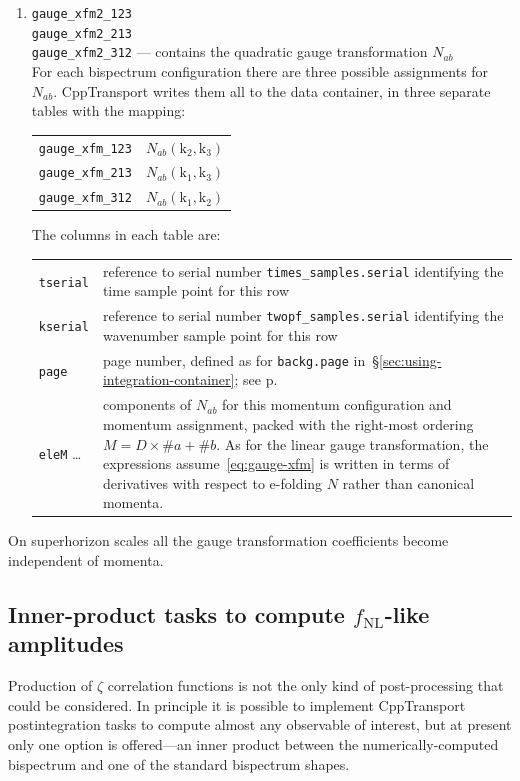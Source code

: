 \documentclass[11pt,a4paper]{article}
\newcommand{\fNL}{f_{\mathrm{NL}}}
\newcommand{\vect}[1]{\bm{\mathrm{{#1}}}}
\newcommand{\packagefont}{\sffamily}
\newcommand{\CppTransport}{{\packagefont CppTransport}}
\newenvironment{sqltablelist}{\renewcommand{\arraystretch}{1.3}\small}{}
\begin{document}
\begin{sqltablelist}
\begin{enumerate}
	\item \texttt{gauge_xfm2_123} \\
    \texttt{gauge_xfm2_213} \\
    \texttt{gauge_xfm2_312} --- contains the quadratic gauge transformation $N_{ab}$ \\
    For each bispectrum configuration there are three possible assignments
    for $N_{ab}$.
    {\CppTransport} writes them all to the data container, in three separate tables
    with the mapping: \\
    \begin{tabular}{p{2.5cm}p{11.5cm}}
    	\texttt{gauge_xfm_123} & $N_{ab}(\vect{k}_2, \vect{k}_3)$ \\
    	\texttt{gauge_xfm_213} & $N_{ab}(\vect{k}_1, \vect{k}_3)$ \\
    	\texttt{gauge_xfm_312} & $N_{ab}(\vect{k}_1, \vect{k}_2)$
    \end{tabular}
	The columns in each table are: \\
	\begin{tabular}{p{2.5cm}p{11.5cm}}
		\texttt{tserial} & reference to serial number \texttt{times_samples.serial}
        identifying the time sample point for this row \\
        \texttt{kserial} & reference to serial number \texttt{twopf_samples.serial}
        identifying the wavenumber sample point for this row \\
        \texttt{page} & page number, defined as for \texttt{backg.page}
        in~\S\ref{sec:using-integration-container}; see p.\pageref{sqltable:backg} \\
        \texttt{eleM} \ldots & components of $N_{ab}$ for this
        momentum configuration and momentum assignment, packed with the right-most
        ordering $M = D \times \#a + \#b$.
        As for the linear gauge transformation, the expressions assume~\eqref{eq:gauge-xfm}
        is written in terms of derivatives with respect to e-folding $N$
        rather than canonical momenta.
	\end{tabular}
\end{enumerate}	
\end{sqltablelist}
On superhorizon scales all the gauge transformation coefficients become independent of
momenta.

\subsection{Inner-product tasks to compute $\fNL$-like amplitudes}
\label{sec:inner-products}
Production of $\zeta$ correlation functions 
is not the only kind of post-processing that could be
considered.
In principle it is possible to implement {\CppTransport} postintegration
tasks to compute almost any observable of interest,
but at present only one option is offered---an inner product between the
numerically-computed bispectrum and one of the standard bispectrum shapes.
\end{document}
